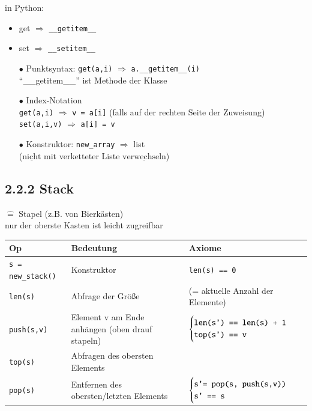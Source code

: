 \documentclass[11pt, fleqn]{scrreprt}
\begin{document}
	in Python: 
	\begin{itemize}[label={}]
		\item get $\Rightarrow$ \verb|__getitem__|
		\item set $\Rightarrow$ \verb|__setitem__|
		\item[$\bullet$] Punktsyntax: \verb|get(a,i)| $\Rightarrow$ \verb|a.__getitem__(i)| \\
		``\_\_getitem\_\_'' ist Methode der Klasse
		\item[$\bullet$] Index-Notation \\
		\verb|get(a,i)| $\Rightarrow$ \verb|v = a[i]| (falls auf der rechten Seite der Zuweisung) \\
		\verb|set(a,i,v)| $\Rightarrow$ \verb|a[i] = v|
		\item[$\bullet$] Konstruktor: \verb|new_array| $\Rightarrow$ list \\
		($\underline{\text{nicht}}$ mit verketteter Liste $\underline{\text{verwechseln}}$)
	\end{itemize}
	
	\subsection*{2.2.2 Stack}
	$\widehat{=}$ Stapel (z.B. von Bierkästen) \\
	nur der oberste Kasten ist leicht zugreifbar \\
	
	\begin{tabular}{C{5cm} C{5cm} C{5cm}}
		Op & Bedeutung & Axiome \\ \hline
		\verb|s = new_stack()| & Konstruktor & \verb|len(s) == 0| \\
		\verb|len(s)| & Abfrage der Größe & (= aktuelle Anzahl der Elemente) \\
		\verb|push(s,v)| & Element v am Ende anhängen (oben drauf stapeln) & $\begin{cases}
		\verb|len(s') == len(s) + 1| \\
		\verb|top(s') == v|
		\end{cases}$ \\
		\verb|top(s)| & Abfragen des obersten Elements & \\
		\verb|pop(s)| & Entfernen des obersten/letzten Elements & $\begin{cases}
		\verb|s'= pop(s, push(s,v))| \\
		\verb|s' == s| \end{cases}$ \\
	\end{tabular} \\
	
\end{document}
